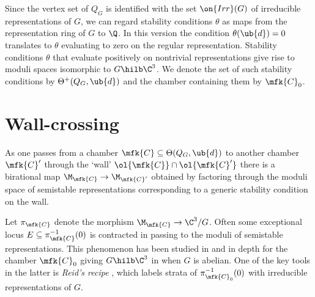 \documentclass[leqno,11pt,a4paper]{amsart}
\begin{document}
Since the vertex set of $Q_G$ is identified with the set $\on{Irr}(G)$ of irreducible representations of $G$, we can regard stability conditions $\theta$ as maps from the representation ring of $G$ to $\Q$. In this version the condition $\theta(\ub{d})=0$ translates to $\theta$ evaluating to zero on the regular representation. Stability conditions $\theta$ that evaluate positively on nontrivial representations give rise to moduli spaces isomorphic to $G\hilb\C^3$. We denote the set of such stability conditions by $\Theta^+(Q_G,\ub{d})$ and the chamber containing them by $\mfk{C}_0$.

\section{Wall-crossing} \label{sec:wall}

As one passes from a chamber $\mfk{C}\subseteq\Theta(Q_G,\ub{d})$ to another chamber $\mfk{C}'$ through the `wall' $\ol{\mfk{C}}\cap\ol{\mfk{C}'}$ there is a birational map $\M_\mfk{C}\to\M_{\mfk{C}'}$ obtained by factoring through the moduli space of semistable representations corresponding to a generic stability condition on the wall.

Let $\pi_\mfk{C}$ denote the morphism $\M_\mfk{C}\to\C^3/G$. Often some exceptional locus $E\subseteq\pi_\mfk{C}^{-1}(0)$ is contracted in passing to the moduli of semistable representations. This phenomenon has been studied in \cite{ci_flo_04} and in depth for the chamber $\mfk{C}_0$ giving $G\hilb\C^3$ in \cite{wor_wal_20} when $G$ is abelian. One of the key tools in the latter is \emph{Reid's recipe} \cite{rei_mck_97,cra_exp_05}, which labels strata of $\pi_{\mfk{C}_0}^{-1}(0)$ with irreducible representations of $G$.
\end{document}
